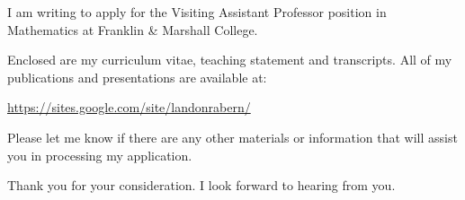 \documentclass[10pt,stdletter,dateno]{newlfm}
\begin{document}
\begin{newlfm}

I am writing to apply for the Visiting Assistant Professor position in Mathematics at Franklin \& Marshall College.


Enclosed are my curriculum vitae, teaching statement and transcripts.  
All of my publications and presentations are available at:

\url{https://sites.google.com/site/landonrabern/}

Please let me know if there are any other materials or information that will assist you in processing my application.

Thank you for your consideration.  I look forward to hearing from you.

\end{newlfm}
\end{document}

